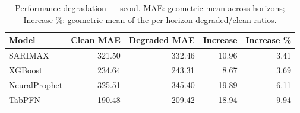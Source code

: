 \begin{table}[h]
\centering
\caption{Performance degradation — seoul. MAE: geometric mean across horizons; Increase \%: geometric mean of the per-horizon degraded/clean ratios.}
\label{tab:degradation_summary_seoul}
\begin{tabular}{lrrrr}
\toprule
Model & Clean MAE & Degraded MAE & Increase & Increase \% \\
\midrule
SARIMAX & 321.50 & 332.46 & 10.96 & 3.41 \\
XGBoost & 234.64 & 243.31 & 8.67 & 3.69 \\
NeuralProphet & 325.51 & 345.40 & 19.89 & 6.11 \\
TabPFN & 190.48 & 209.42 & 18.94 & 9.94 \\
\bottomrule
\end{tabular}
\end{table}
